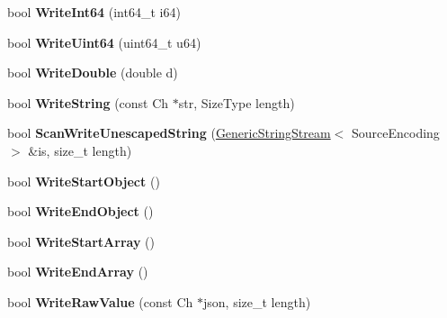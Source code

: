 \begin{DoxyCompactItemize}
\item 
bool {\bfseries Write\+Int64} (int64\+\_\+t i64)\hypertarget{class_writer_aa58d3f80c06394648de5055ecfb41587}{}\label{class_writer_aa58d3f80c06394648de5055ecfb41587}

\item 
bool {\bfseries Write\+Uint64} (uint64\+\_\+t u64)\hypertarget{class_writer_ad07b325157220e3aa791c1c8c904021e}{}\label{class_writer_ad07b325157220e3aa791c1c8c904021e}

\item 
bool {\bfseries Write\+Double} (double d)\hypertarget{class_writer_ae7a0fc4740681d845d92c1213bd25aa1}{}\label{class_writer_ae7a0fc4740681d845d92c1213bd25aa1}

\item 
bool {\bfseries Write\+String} (const Ch $\ast$str, Size\+Type length)\hypertarget{class_writer_acda4412ef5f4cac6e89f9544e4b10f70}{}\label{class_writer_acda4412ef5f4cac6e89f9544e4b10f70}

\item 
bool {\bfseries Scan\+Write\+Unescaped\+String} (\hyperlink{struct_generic_string_stream}{Generic\+String\+Stream}$<$ Source\+Encoding $>$ \&is, size\+\_\+t length)\hypertarget{class_writer_a94140803bba7863a1b39c936bbe6d262}{}\label{class_writer_a94140803bba7863a1b39c936bbe6d262}

\item 
bool {\bfseries Write\+Start\+Object} ()\hypertarget{class_writer_a81c72a2eecd47e042f56ca93a27a5cb1}{}\label{class_writer_a81c72a2eecd47e042f56ca93a27a5cb1}

\item 
bool {\bfseries Write\+End\+Object} ()\hypertarget{class_writer_a7e3f6760a50a72f4217a9b2d625c43ee}{}\label{class_writer_a7e3f6760a50a72f4217a9b2d625c43ee}

\item 
bool {\bfseries Write\+Start\+Array} ()\hypertarget{class_writer_a3c3560a96cac58f98f4a74d6cb227204}{}\label{class_writer_a3c3560a96cac58f98f4a74d6cb227204}

\item 
bool {\bfseries Write\+End\+Array} ()\hypertarget{class_writer_aabda2df1be6e83cef416e9b1f042e8f4}{}\label{class_writer_aabda2df1be6e83cef416e9b1f042e8f4}

\item 
bool {\bfseries Write\+Raw\+Value} (const Ch $\ast$json, size\+\_\+t length)\hypertarget{class_writer_a8ee1135b2595261819b134907f67614e}{}\label{class_writer_a8ee1135b2595261819b134907f67614e}


\end{DoxyCompactItemize}
